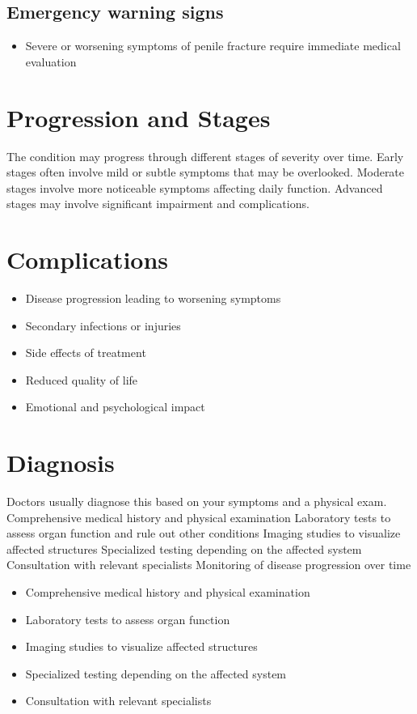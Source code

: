 \subsection{Emergency warning signs}
\begin{itemize}[noitemsep]
  \item Severe or worsening symptoms of penile fracture require immediate medical evaluation
\end{itemize}
\section{Progression and Stages}
The condition may progress through different stages of severity over time. Early stages often involve mild or subtle symptoms that may be overlooked. Moderate stages involve more noticeable symptoms affecting daily function. Advanced stages may involve significant impairment and complications.
\section{Complications}
\begin{itemize}[noitemsep]
  \item Disease progression leading to worsening symptoms
  \item Secondary infections or injuries
  \item Side effects of treatment
  \item Reduced quality of life
  \item Emotional and psychological impact
\end{itemize}
\section{Diagnosis}
Doctors usually diagnose this based on your symptoms and a physical exam. Comprehensive medical history and physical examination Laboratory tests to assess organ function and rule out other conditions Imaging studies to visualize affected structures Specialized testing depending on the affected system Consultation with relevant specialists Monitoring of disease progression over time

\begin{itemize}[noitemsep]
  \item Comprehensive medical history and physical examination
  \item Laboratory tests to assess organ function
  \item Imaging studies to visualize affected structures
  \item Specialized testing depending on the affected system
  \item Consultation with relevant specialists
\end{itemize}

